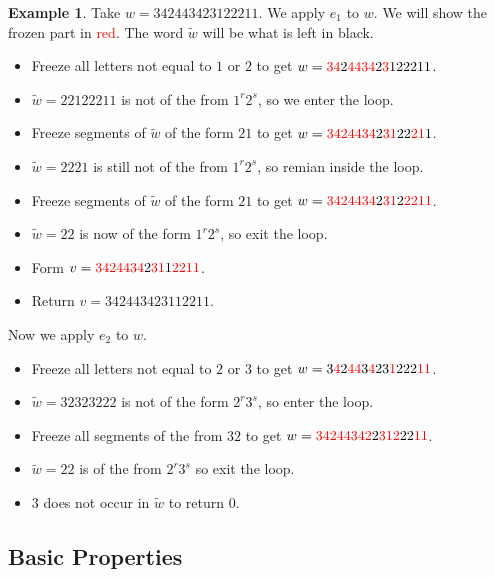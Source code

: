 \documentclass[12pt]{amsart}
\newcommand{\rc}[1]{\textcolor{red}{#1}}
\theoremstyle{definition}
\theoremstyle{example}
\newtheorem{example}[theorem]{Example}
\begin{document}
\begin{example}
  Take $w=342443423122211$.
  We apply $e_1$ to $w$.
  We will show the frozen part in \rc{red}.
  The word $\tilde w$ will be what is left in black.
  \begin{itemize}
  \item Freeze all letters not equal to $1$ or $2$ to get $w=\rc{34}2\rc{4434}2\rc{3}122211$.
  \item $\tilde w=22122211$ is not of the from $1^r2^s$, so we enter the loop.
  \item Freeze segments of $\tilde w$ of the form $21$ to get $w=\rc{34}\rc{2}\rc{4434}2\rc{31}22\rc{21}1$.
  \item $\tilde w=2221$ is still not of the from $1^r2^s$, so remian inside the loop.
  \item Freeze segments of $\tilde w$ of the form $21$ to get $w=\rc{34}\rc{2}\rc{4434}2\rc{31}2\rc{2211}$.
  \item $\tilde w = 22$ is now of the form $1^r2^s$, so exit the loop.
  \item Form $v=\rc{34}\rc{2}\rc{4434}2\rc{31}1\rc{2211}$.
  \item Return $v=342443423112211$.
  \end{itemize}
  
  Now we apply $e_2$ to $w$.
  \begin{itemize}
  \item Freeze all letters not equal to $2$ or $3$ to get $w=3\rc{4}2\rc{44}3\rc{4}23\rc{1}222\rc{11}$.
  \item $\tilde w = 32323222$ is not of the form $2^r3^s$, so enter the loop.
  \item Freeze all segments of the from $32$ to get $w=\rc{342}\rc{44}\rc{342}2\rc{312}22\rc{11}$.
  \item $\tilde w = 22$ is of the from $2^r3^s$ so exit the loop.
  \item $3$ does not occur in $\tilde w$ to return $0$.
  \end{itemize}
\end{example}

\subsection{Basic Properties}
\label{sec:basic-properties}
\end{document}
